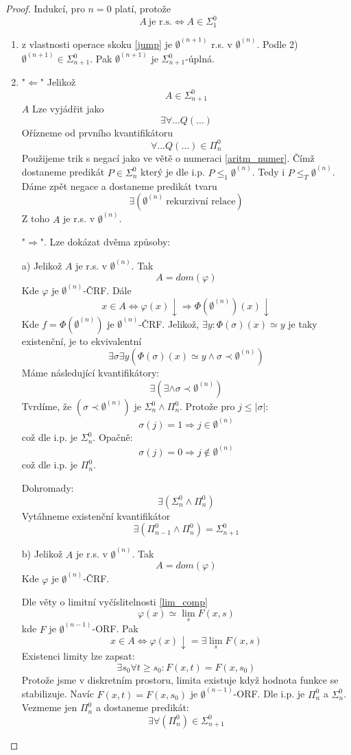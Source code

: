 \begin{proof}
	Indukcí, pro $n = 0$ platí, protože
	\[ A\ \text{je r.s.} \iff A \in \Sigma_1^0 \]
	\begin{enumerate}
		\item z vlastnosti operace skoku \cref{jump} je $\emptyset^{(n + 1)}$ r.s. v $\emptyset^{(n)}$.
			Podle 2) $\emptyset^{(n + 1)} \in \Sigma_{n + 1}^0$.
			Pak $\emptyset^{(n + 1)}$ je $\Sigma_{n + 1}^0$-úplná.
		\item "$\Leftarrow$" Jelikož
			\[ A \in \Sigma_{n + 1}^0 \]
			$A$ Lze vyjádřit jako
			\[ \exists \forall \ldots Q(\ldots) \]
			Ořízneme od prvního kvantifikátoru
			\[ \forall \ldots Q(\ldots) \in \Pi_n^0 \]
			Použijeme trik s negací jako ve větě o numeraci \cref{aritm_numer}.
			Čímž dostaneme predikát $P \in \Sigma_{n}^0$ který je dle i.p. $P \leq_1 \emptyset^{(n)}$.
			Tedy i $P \leq_T \emptyset^{(n)}$.
			Dáme zpět negace a dostaneme predikát tvaru
			\[ \exists (\emptyset^{(n)}\ \text{rekurzivní relace}) \]
			Z toho $A$ je r.s. v $\emptyset^{(n)}$.

		"$\Rightarrow$". Lze dokázat dvěma způsoby:

			a) Jelikož $A$ je r.s. v $\emptyset^{(n)}$. Tak
			\[ A = dom(\varphi) \]
			Kde $\varphi$ je $\emptyset^{(n)}$-ČRF.
			Dále
			\[ x \in A \iff \varphi(x) \downarrow \Rightarrow \Phi(\emptyset^{(n)})(x) \downarrow \]
			Kde $f = \Phi(\emptyset^{(n)})$ je $\emptyset^{(n)}$-ČRF.
			Jelikož, $\exists y:\Phi(\sigma)(x) \simeq y$ je taky existenční, je to ekvivalentní
			\[ \exists \sigma \exists y(\Phi(\sigma)(x) \simeq y \land \sigma \prec \emptyset^{(n)}) \]
			Máme následující kvantifikátory:
			\[ \exists (\exists \land \sigma \prec \emptyset^{(n)}) \]
			Tvrdíme, že $(\sigma \prec \emptyset^{(n)})$ je $\Sigma_n^0 \land \Pi_n^0$.
			Protože pro $j \leq |\sigma|$:
			\[ \sigma(j) = 1 \Rightarrow j \in \emptyset^{(n)} \]
			což dle i.p. je $\Sigma_n^0$.
			Opačně:
			\[ \sigma(j) = 0 \Rightarrow j \notin \emptyset^{(n)} \]
			což dle i.p. je $\Pi_n^0$.

			Dohromady:
			\[ \exists(\Sigma_n^0 \land \Pi_n^0)\]
			Vytáhneme existenční kvantifikátor
			\[\exists(\Pi_{n - 1}^0 \land \Pi_n^0) = \Sigma_{n + 1}^0 \]

			b) Jelikož $A$ je r.s. v $\emptyset^{(n)}$. Tak
			\[ A = dom(\varphi) \]
			Kde $\varphi$ je $\emptyset^{(n)}$-ČRF.

			Dle věty o limitní vyčíslitelnosti \cref{lim_comp}
			\[ \varphi(x) \simeq \lim_s F(x, s) \]
			kde $F$ je $\emptyset^{(n - 1)}$-ORF. Pak
			\[ x \in A \iff \varphi(x) \downarrow = \exists \lim_s F(x, s) \]
			Existenci limity lze zapsat:
			\[ \exists s_0 \forall t \geq s_0: F(x, t) = F(x, s_0) \]
			Protože jsme v diskretním prostoru, limita existuje když hodnota funkce se stabilizuje.
			Navíc $F(x, t) = F(x, s_0)$ je $\emptyset^{(n - 1)}$-ORF.
			Dle i.p. je $\Pi_n^0$ a $\Sigma_n^0$.
			Vezmeme jen $\Pi_n^0$ a dostaneme predikát:
			\[ \exists \forall(\Pi_n^0) \in \Sigma_{n + 1}^0 \]


\end{enumerate}
\end{proof}

